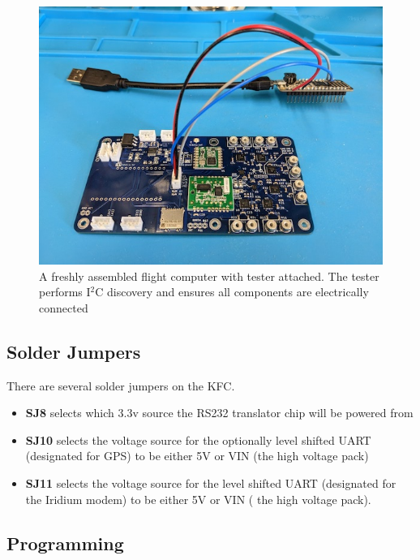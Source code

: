 \documentclass{article}
\begin{document}
\begin{figure}[H]
\centering
\includegraphics[width=\textwidth]{images/fctester}
\caption{A freshly assembled flight computer with tester attached. The tester performs I$^2$C discovery and ensures all components are electrically connected}
\label{fig:fc-tester}
\end{figure}

\subsection{Solder Jumpers}

There are several solder jumpers on the KFC.
\begin{itemize}
\item \textbf{SJ8} selects which 3.3v source the RS232 translator chip will be powered from 
\item \textbf{SJ10} selects the voltage source for the optionally level shifted UART (designated for GPS) to be either 5V or VIN (the high voltage pack)
\item \textbf{SJ11} selects the voltage source for the level shifted UART (designated for the Iridium modem) to be either 5V or VIN ( the high voltage pack).
\end{itemize}

\subsection{Programming}




\appendix
\end{document}
